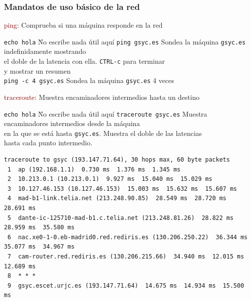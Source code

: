 \documentclass[ucs]{beamer}
\newcommand{\res}[1]{\textcolor{darkred}{#1}}
\begin{document}

\begin{frame}[shrink=5,fragile]
\frametitle{Mandatos de uso básico de la red}
\vspace{1.0cm}
   \res{ping}: Comprueba si una máquina responde en la red
    \begin{footnotesize}
      \begin{tabbing}
        \verb|echo hola|\hspace{1.7cm} \= No escribe nada útil aquí\kill
        \verb|ping gsyc.es| \>  Sondea la máquina \verb|gsyc.es|
        indefinidamente mostrando\\\> el doble de la latencia con
        ella. \verb|CTRL-c| para terminar\\\> y mostrar un resumen \\ 
        \verb|ping -c 4 gsyc.es| \>  Sondea la máquina \verb|gsyc.es|
        4 veces\\
      \end{tabbing}
    \end{footnotesize}
  
\vspace{0.7cm}
   \res{traceroute}: Muestra encaminadores intermedios hasta un destino
    \begin{footnotesize}
      \begin{tabbing}
        \verb|echo hola|\hspace{1.7cm} \= No escribe nada útil aquí\kill
        \verb|traceroute gsyc.es| \>  Muestra encaminadores
        intermedios desde la máquina\\\> en la que se está hasta
        \verb|gsyc.es|. Muestra el doble de las latencias\\\>hasta cada punto intermedio.
      \end{tabbing}
    \end{footnotesize}
\end{frame}



\begin{frame}[fragile]

  \begin{scriptsize}
  \begin{verbatim}
traceroute to gsyc (193.147.71.64), 30 hops max, 60 byte packets
 1  ap (192.168.1.1)  0.730 ms  1.376 ms  1.345 ms
 2  10.213.0.1 (10.213.0.1)  9.927 ms  15.040 ms  15.029 ms
 3  10.127.46.153 (10.127.46.153)  15.003 ms  15.632 ms  15.607 ms
 4  mad-b1-link.telia.net (213.248.90.85)  28.549 ms  28.720 ms  28.691 ms
 5  dante-ic-125710-mad-b1.c.telia.net (213.248.81.26)  28.822 ms  28.959 ms  35.580 ms
 6  nac.xe0-1-0.eb-madrid0.red.rediris.es (130.206.250.22)  36.344 ms  35.077 ms  34.967 ms
 7  cam-router.red.rediris.es (130.206.215.66)  34.940 ms  12.015 ms  12.689 ms
 8  * * *
 9  gsyc.escet.urjc.es (193.147.71.64)  14.675 ms  14.934 ms  15.500 ms
  \end{verbatim}
  \end{scriptsize}
\end{frame}
\end{document}
